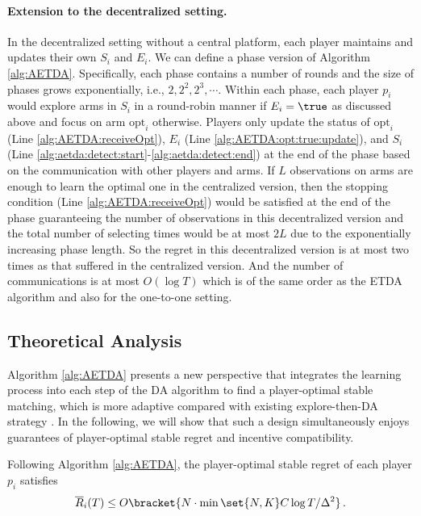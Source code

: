 \paragraph{Extension to the decentralized setting. }
In the decentralized setting without a central platform, each player maintains and updates their own $S_i$ and $E_i$. We can define a phase version of Algorithm \ref{alg:AETDA}. Specifically, each phase contains a number of rounds and the size of phases grows exponentially, i.e., $2,2^2,2^3,\cdots$. Within each phase, each player $p_i$ would explore arms in $S_i$ in a round-robin manner if $E_i=\true$ as discussed above and focus on arm $\mathrm{opt}_i$ otherwise. 
Players only update the status of $\mathrm{opt}_i$ (Line \ref{alg:AETDA:receiveOpt}), $E_i$ (Line \ref{alg:AETDA:opt:true:update}),  and $S_i$ (Line \ref{alg:aetda:detect:start}-\ref{alg:aetda:detect:end}) at the end of the phase based on the communication with other players and arms. 
If $L$ observations on arms are enough to learn the optimal one in the centralized version, then the stopping condition (Line \ref{alg:AETDA:receiveOpt}) would be satisfied at the end of the phase guaranteeing the number of observations in this decentralized version and the total number of selecting times would be at most $2L$ due to the exponentially increasing phase length. 
So the regret in this decentralized version is at most two times as that suffered in the centralized version. And the number of communications is at most $O(\log T)$ which is of the same order as the ETDA algorithm and also \citet{kong2023player} for the one-to-one setting. 





\subsection{Theoretical Analysis}

Algorithm \ref{alg:AETDA} presents a new perspective that integrates the learning process into each step of the DA algorithm to find a player-optimal stable matching, which is more adaptive compared with existing explore-then-DA strategy \citep{zhang2022matching,kong2023player}. In the following, we will show that such a design simultaneously enjoys guarantees of player-optimal stable regret and incentive compatibility. 



\begin{theorem}\label{thm:aetgs:regret}
    Following Algorithm \ref{alg:AETDA}, the player-optimal stable regret of each player $p_i$ satisfies
    \begin{align*}
        \overline{R}_i(T) \le O\bracket{ N\cdot \min\set{N, K}C \log T/\Delta^2  } \,.
    \end{align*}
\end{theorem}



